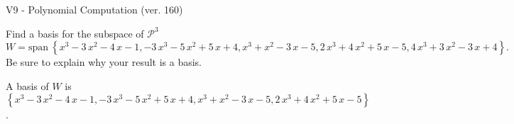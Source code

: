 \begin{exercise}
  \begin{exerciseTitle}V9 - Polynomial Computation (ver. 160)\end{exerciseTitle}
  \begin{exerciseStatement}
    Find a basis for the subspace of \(\mathcal{P}^3\) 
\[W=\mathrm{span}\ \left\{x^{3} - 3 \, x^{2} - 4 \, x - 1 , -3 \, x^{3} - 5 \, x^{2} + 5 \, x + 4 , x^{3} + x^{2} - 3 \, x - 5 , 2 \, x^{3} + 4 \, x^{2} + 5 \, x - 5 , 4 \, x^{3} + 3 \, x^{2} - 3 \, x + 4\right\}.\]
 Be sure to explain why your result is a basis.


  \end{exerciseStatement}
  \begin{exerciseAnswer}
   A basis of \(W\) is  \(\left\{x^{3} - 3 \, x^{2} - 4 \, x - 1 , -3 \, x^{3} - 5 \, x^{2} + 5 \, x + 4 , x^{3} + x^{2} - 3 \, x - 5 , 2 \, x^{3} + 4 \, x^{2} + 5 \, x - 5\right\}\).
  


  \end{exerciseAnswer}
\end{exercise}